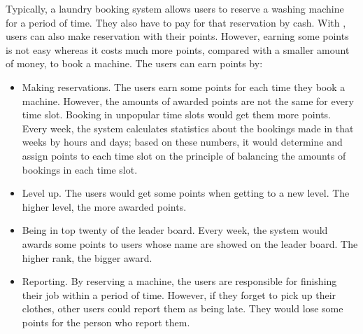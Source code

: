 Typically, a laundry booking system allows users to reserve a washing machine for a period of time. They also have to pay for that reservation by cash. With {\toolname}, users can also make reservation with their points. However, earning some points is not easy whereas it costs much more points, compared with a smaller amount of money, to book a machine. The users can earn points by:
\begin{itemize}
\item Making reservations. The users earn some points for each time they book a machine. However, the amounts of awarded points are not the same for every time slot. Booking in unpopular time slots would get them more points. Every week, the system calculates statistics about the bookings made in that weeks by hours and days; based on these numbers, it would determine and assign points to each time slot on the principle of balancing the amounts of bookings in each time slot.
\item Level up. The users would get some points when getting to a new level. The higher level, the more awarded points.
\item Being in top twenty of the leader board. Every week, the system would awards some points to users whose name are showed on the leader board. The higher rank, the bigger award.
\item Reporting. By reserving a machine, the users are responsible for finishing their job within a period of time. However, if they forget to pick up their clothes, other users could report them as being late. They would lose some points for the person who report them.
\end{itemize}